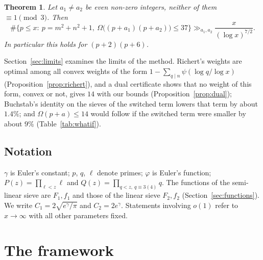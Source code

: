 \documentclass[11pt,a4paper]{amsart}
\newtheorem{theorem}{Theorem}[section]
\theoremstyle{remark}
\numberwithin{equation}{section}
\newcommand{\eg}{e^{\gamma}}
\begin{document}
\begin{theorem}\label{thm:pair}
Let $a_1\ne a_2$ be even non-zero integers, neither of them $\equiv1\pmod 3$. Then
\[
\#\{p\le x:\ p=m^2+n^2+1,\ \Omega\bigl((p+a_1)(p+a_2)\bigr)\le 37\}\gg_{a_1,a_2}\frac{x}{(\log x)^{7/2}} .
\]
In particular this holds for $(p+2)(p+6)$.
\end{theorem}

Section~\ref{sec:limits} examines the limits of the method. Richert's weights are optimal among all convex
weights of the form $1-\sum_{q\mid n}\psi(\log q/\log x)$ (Proposition~\ref{prop:richert}), and a dual
certificate shows that no weight of this form, convex or not, gives $14$ with our bounds
(Proposition~\ref{prop:dual}); Buchstab's identity on the sieves of the switched term lowers that term by
about $1.4\%$; and $\Omega(p+a)\le14$ would follow if the switched term were smaller by about $9\%$
(Table~\ref{tab:whatif}).

\subsection*{Notation}
$\gamma$ is Euler's constant; $p$, $q$, $\ell$ denote primes; $\varphi$ is Euler's function; $P(z)=\prod_{\ell<z}\ell$
and $Q(z)=\prod_{q<z,\ q\equiv3(4)}q$. The functions of the semi-linear sieve are $F_1,f_1$ and those of the linear
sieve $F_2,f_2$ (Section~\ref{sec:functions}). We write $C_1=2\sqrt{\eg/\pi}$ and $C_2=2\eg$. Statements
involving $o(1)$ refer to $x\to\infty$ with all other parameters fixed.

\section{The framework}\label{sec:framework}
\end{document}
